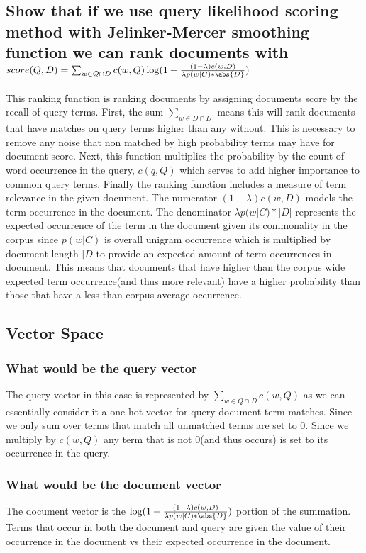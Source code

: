 \documentclass[11pt]{article}
\begin{document}
\subsection{Show that if we use query likelihood scoring method with Jelinker-Mercer smoothing function we can rank documents with \\$score(Q,D) = \sum_{w \in Q \cap D} c(w,Q)\log(1 + \frac{(1-\lambda)c(w,D)}{\lambda p (w| C)*\abs{D}})$}
This ranking function is ranking documents by assigning documents score by the recall of query terms. First, the sum $\sum_{w \in D \cap D}$ means this will rank documents that have matches on query terms higher than any without. This is necessary to remove any noise that non matched by high probability terms may have for document score. Next, this function multiplies the probability by the count of word occurrence in the query, $c(q,Q)$ which serves to add higher importance to common query terms. Finally the ranking function includes a measure of term relevance in the given document. The numerator $(1-\lambda)c(w,D)$ models the term occurrence in the document. The denominator $\lambda p(w|C)*|D|$ represents the expected occurrence of the term in the document given its commonality in the corpus since $p(w|C)$ is overall unigram occurrence which is multiplied by document length $|D$ to provide an expected amount of term occurrences in document. This means that documents that have higher than the corpus wide expected term occurrence(and thus more relevant) have a higher probability than those that have a less than corpus average occurrence. 
\subsection{Vector Space}
\subsubsection{What would be the query vector}
The query vector in this case is represented by $\sum_{w \in Q \cap D} c(w,Q)$ as we can essentially consider it a one hot vector for query document term matches. Since we only sum over terms that match all unmatched terms are set to 0. Since we multiply by $c(w,Q)$ any term that is not 0(and thus occurs) is set to its occurrence in the query.
\subsubsection{What would be the document vector}
The document vector is the $\log(1 + \frac{(1-\lambda)c(w,D)}{\lambda p (w| C)*\abs{D}})$ portion of the summation. Terms that occur in both the document and query are given the value of their occurrence in the document vs their expected occurrence in the document. 
\end{document}
